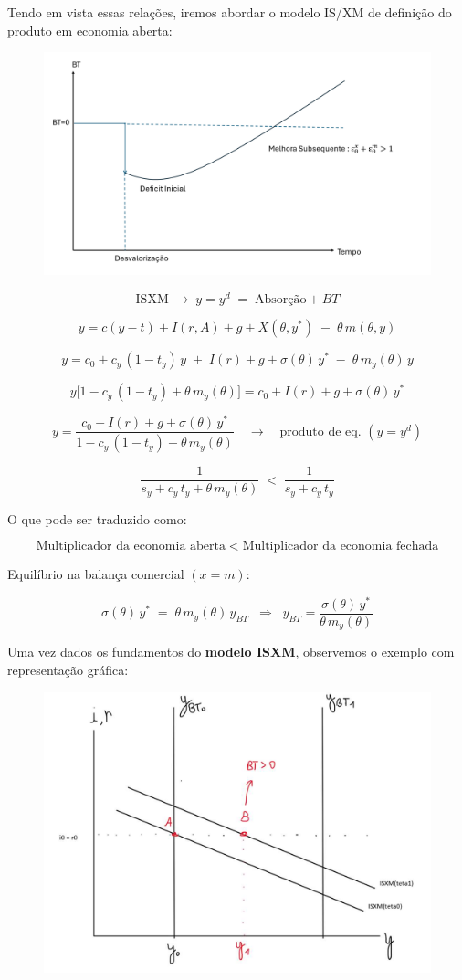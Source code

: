 \documentclass[a4paper,12pt]{article}[abntex2]
\begin{document}
Tendo em vista essas relações, iremos abordar o modelo IS/XM de definição do produto em economia aberta:

\begin{figure}[H]
    \centering
    \includegraphics[width=0.7\linewidth]{Imagens/a21i1.png}
\end{figure}

\[
\mathrm{ISXM}\;\to\;
y = y^{d} \;=\; \text{Absorção} + BT
\]

\[
y = c(y - t) + I(r, A) + g + X(\theta, y^*) \;-\;\theta\,m(\theta,y)
\]

\[
y = c_{0} + c_{y}\,(1 - t_{y})\,y \;+\; I(r) + g + \sigma(\theta)\,y^* \;-\;\theta\,m_{y}(\theta)\,y
\]

\[
y\bigl[1 - c_{y}\,(1 - t_{y}) + \theta\,m_{y}(\theta)\bigr]
= c_{0} + I(r) + g + \sigma(\theta)\,y^*
\]

\[
y = \frac{c_{0} + I(r) + g + \sigma(\theta)\,y^*}
{1 - c_{y}\,(1 - t_{y}) + \theta\,m_{y}(\theta)}
\quad\to\quad
\text{produto de eq. }(y = y^{d})
\]

\[
\frac{1}{s_{y} + c_{y}\,t_{y} + \theta\,m_{y}(\theta)}
\;<\;
\frac{1}{s_{y} + c_{y}\,t_{y}}
\]

O que pode ser traduzido como:

\[
\text{Multiplicador da economia aberta}
\;<\;
\text{Multiplicador da economia fechada}
\]

Equilíbrio na balança comercial \((x = m)\):

\[
\sigma(\theta)\,y^* \;=\; \theta\,m_{y}(\theta)\,y_{BT}
\;\;\Longrightarrow\;\;
y_{BT} = \frac{\sigma(\theta)\,y^*}{\theta\,m_{y}(\theta)}
\]


Uma vez dados os fundamentos do \textbf{modelo ISXM}, observemos o exemplo com representação gráfica: 

\begin{figure}[H]
    \centering
    \includegraphics[width=0.7\linewidth]{Imagens/a22i1.png}
\end{figure}
\end{document}
